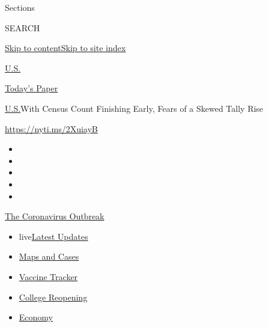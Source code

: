 Sections

SEARCH

\protect\hyperlink{site-content}{Skip to
content}\protect\hyperlink{site-index}{Skip to site index}

\href{https://www.nytimes.com/section/us}{U.S.}

\href{https://myaccount.nytimes.com/auth/login?response_type=cookie\&client_id=vi}{}

\href{https://www.nytimes.com/section/todayspaper}{Today's Paper}

\href{/section/us}{U.S.}\textbar{}With Census Count Finishing Early,
Fears of a Skewed Tally Rise

\url{https://nyti.ms/2XuiayB}

\begin{itemize}
\item
\item
\item
\item
\item
\end{itemize}

\href{https://www.nytimes.com/news-event/coronavirus?action=click\&pgtype=Article\&state=default\&region=TOP_BANNER\&context=storylines_menu}{The
Coronavirus Outbreak}

\begin{itemize}
\tightlist
\item
  live\href{https://www.nytimes.com/2020/08/04/world/coronavirus-cases.html?action=click\&pgtype=Article\&state=default\&region=TOP_BANNER\&context=storylines_menu}{Latest
  Updates}
\item
  \href{https://www.nytimes.com/interactive/2020/us/coronavirus-us-cases.html?action=click\&pgtype=Article\&state=default\&region=TOP_BANNER\&context=storylines_menu}{Maps
  and Cases}
\item
  \href{https://www.nytimes.com/interactive/2020/science/coronavirus-vaccine-tracker.html?action=click\&pgtype=Article\&state=default\&region=TOP_BANNER\&context=storylines_menu}{Vaccine
  Tracker}
\item
  \href{https://www.nytimes.com/2020/08/02/us/covid-college-reopening.html?action=click\&pgtype=Article\&state=default\&region=TOP_BANNER\&context=storylines_menu}{College
  Reopening}
\item
  \href{https://www.nytimes.com/live/2020/08/04/business/stock-market-today-coronavirus?action=click\&pgtype=Article\&state=default\&region=TOP_BANNER\&context=storylines_menu}{Economy}
\end{itemize}

